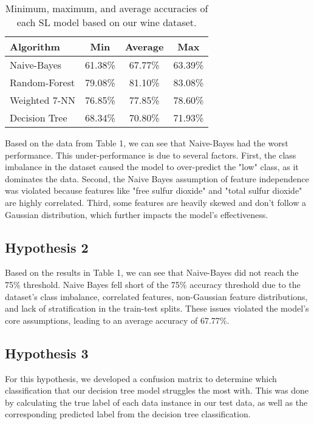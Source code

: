 \documentclass{article}
\theoremstyle{plain}
\theoremstyle{definition}
\theoremstyle{remark}
\begin{document}
\begin{table}[h]
\centering
\begin{tabular}{lccc}
\toprule
Algorithm & Min & Average & Max \\
\midrule
Naive-Bayes & 61.38\% & 67.77\% & 63.39\% \\
Random-Forest & 79.08\% & 81.10\% & 83.08\% \\
Weighted 7-NN & 76.85\% & 77.85\% & 78.60\% \\
Decision Tree & 68.34\% & 70.80\% & 71.93\% \\

\bottomrule
\end{tabular}
\caption{Minimum, maximum, and average accuracies of each SL model based on our wine dataset.}
\label{tab:algorithm_performance}
\end{table}

Based on the data from Table 1, we can see that Naive-Bayes had the worst performance. This under-performance is due to several factors. First, the class imbalance in the dataset caused the model to over-predict the "low" class, as it dominates the data. Second, the Naive Bayes assumption of feature independence was violated because features like "free sulfur dioxide" and "total sulfur dioxide" are highly correlated. Third, some features are heavily skewed and don’t follow a Gaussian distribution, which further impacts the model’s effectiveness. 

\subsection{Hypothesis 2}

Based on the results in Table 1, we can see that Naive-Bayes did not reach the 75\% threshold. Naive Bayes fell short of the 75\% accuracy threshold due to the dataset’s class imbalance, correlated features, non-Gaussian feature distributions, and lack of stratification in the train-test splits. These issues violated the model’s core assumptions, leading to an average accuracy of 67.77\%.

\subsection{Hypothesis 3}

For this hypothesis, we developed a confusion matrix to determine which classification that our decision tree model struggles the most with. This was done by calculating the true label of each data instance in our test data, as well as the corresponding predicted label from the decision tree classification. 
\end{document}
